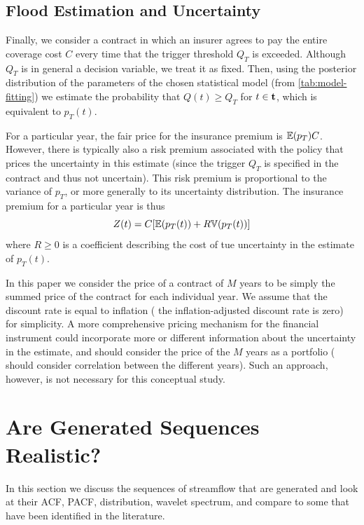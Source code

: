 \documentclass[12pt]{article}
\begin{document}
\subsection{Flood Estimation and Uncertainty}

Finally, we consider a contract in which an insurer agrees to pay the entire coverage cost \(C\) every time that the trigger threshold \(Q_T\) is exceeded.
Although \(Q_T\) is in general a decision variable, we treat it as fixed.
Then, using the posterior distribution of the parameters of the chosen statistical model (from \cref{tab:model-fitting}) we estimate the probability that \(Q(t) \geq Q_T\) for \(t \in \vb{t}\), which is equivalent to \(p_T(t)\).

For a particular year, the fair price for the insurance premium is \(\mathbb{E} \qty(p_T) C\).
However, there is typically also a risk premium associated with the policy that prices the uncertainty in this estimate (since the trigger \(Q_T\) is specified in the contract and thus not uncertain).
This risk premium is proportional to the variance of \(p_T\), or more generally to its uncertainty distribution.
The insurance premium for a particular year is thus
\begin{equation} \label{eq:premium}
  Z(t) = C \qty[\mathbb{E} \qty(p_T(t)) + R \mathbb{V} \qty(p_T(t))]
\end{equation}
where \(R \geq 0\) is a coefficient describing the cost of tue uncertainty in the estimate of \(p_T(t)\).

In this paper we consider the price of a contract of \(M\) years to be simply the summed price of the contract for each individual year.
We assume that the discount rate is equal to inflation (\ie{} the inflation-adjusted discount rate is zero) for simplicity.
A more comprehensive pricing mechanism for the financial instrument could incorporate more or different information about the uncertainty in the estimate, and should consider the price of the \(M\) years as a portfolio (\ie{} should consider correlation between the different years).
Such an approach, however, is not necessary for this conceptual study.

\section{Are Generated Sequences Realistic?\label{sec:sequence-realistic}}

In this section we discuss the sequences of streamflow that are generated and look at their ACF, PACF, distribution, wavelet spectrum, \etc{} and compare to some that have been identified in the literature.
\end{document}
